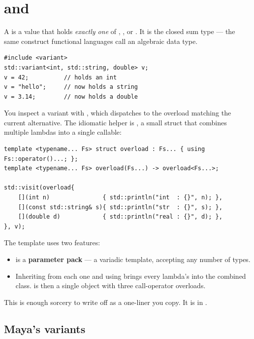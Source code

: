 \section{ and }
\label{sec:cpp:variant}

A  is a value that holds \emph{exactly
one} of , , or . It is the \cpp{} closed sum
type --- the same construct functional languages call an algebraic
data type.

\begin{lstlisting}
#include <variant>
std::variant<int, std::string, double> v;
v = 42;          // holds an int
v = "hello";     // now holds a string
v = 3.14;        // now holds a double
\end{lstlisting}

You inspect a variant with , which dispatches to
the overload matching the current alternative. The idiomatic helper
is , a small struct that combines multiple lambdas
into a single callable:

\begin{lstlisting}
template <typename... Fs> struct overload : Fs... { using Fs::operator()...; };
template <typename... Fs> overload(Fs...) -> overload<Fs...>;

std::visit(overload{
    [](int n)               { std::println("int  : {}", n); },
    [](const std::string& s){ std::println("str  : {}", s); },
    [](double d)            { std::println("real : {}", d); },
}, v);
\end{lstlisting}

The  template uses two features:

\begin{itemize}[leftmargin=*]
  \item {} is a \textbf{parameter pack} --- a variadic
    template, accepting any number of types.
  \item Inheriting from each one and using  brings every lambda's  into
    the combined class.  is then a single
    object with three call-operator overloads.
\end{itemize}

This is enough \cpp{} sorcery to write off as a one-liner you copy.
It is in .

\subsection{Maya's variants}

